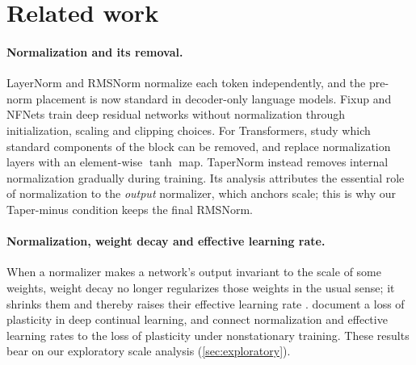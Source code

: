 \documentclass[11pt]{article}
\begin{document}
\section{Related work}

\paragraph{Normalization and its removal.} LayerNorm \citep{ba2016layer} and RMSNorm \citep{zhang2019rmsnorm}
normalize each token independently, and the pre-norm placement \citep{xiong2020layer} is now standard in
decoder-only language models. Fixup \citep{zhang2019fixup} and NFNets \citep{brock2021nfnet} train deep residual
networks without normalization through initialization, scaling and clipping choices. For Transformers,
\citet{he2024simplifying} study which standard components of the block can be removed, and
\citet{zhu2025dyt} replace normalization layers with an element-wise $\tanh$ map. TaperNorm
\citep{kanavalau2026tapernorm} instead removes internal normalization gradually during training. Its analysis
attributes the essential role of normalization to the \emph{output} normalizer, which anchors scale; this is why
our Taper-minus condition keeps the final RMSNorm.

\paragraph{Normalization, weight decay and effective learning rate.} When a normalizer makes a network's output
invariant to the scale of some weights, weight decay no longer regularizes those weights in the usual sense;
it shrinks them and thereby raises their effective learning rate \citep{vanlaarhoven2017l2,zhang2019weightdecay}.
\citet{dohare2024loss} document a loss of plasticity in deep continual learning, and
\citet{lyle2024normalization} connect normalization and effective learning rates to the loss of plasticity under
nonstationary training. These results bear on our exploratory scale analysis (\cref{sec:exploratory}).
\end{document}
